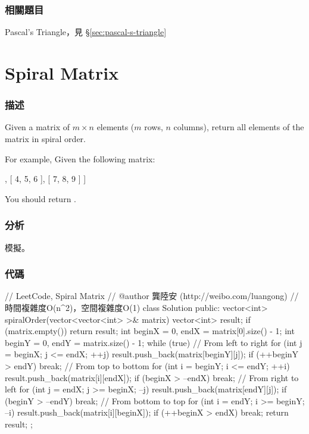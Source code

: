 \subsubsection{相關題目}
\begindot
\item Pascal's Triangle，見 \S \ref{sec:pascal-s-triangle}
\myenddot


\section{Spiral Matrix} %
\label{sec:spiral-matrix}


\subsubsection{描述}
Given a matrix of $m \times n$ elements ($m$ rows, $n$ columns), return all elements of the matrix in spiral order.

For example,
Given the following matrix:
\begin{Code}
[
 [ 1, 2, 3 ],
 [ 4, 5, 6 ],
 [ 7, 8, 9 ]
]
\end{Code}
You should return \fn{[1,2,3,6,9,8,7,4,5]}.


\subsubsection{分析}
模擬。

\subsubsection{代碼}
\begin{Code}
// LeetCode, Spiral Matrix
// @author 龔陸安 (http://weibo.com/luangong)
// 時間複雜度O(n^2)，空間複雜度O(1)
class Solution {
public:
    vector<int> spiralOrder(vector<vector<int> >& matrix) {
        vector<int> result;
        if (matrix.empty()) return result;
        int beginX = 0, endX = matrix[0].size() - 1;
        int beginY = 0, endY = matrix.size() - 1;
        while (true) {
            // From left to right
            for (int j = beginX; j <= endX; ++j) result.push_back(matrix[beginY][j]);
            if (++beginY > endY) break;
            // From top to bottom
            for (int i = beginY; i <= endY; ++i) result.push_back(matrix[i][endX]);
            if (beginX > --endX) break;
            // From right to left
            for (int j = endX; j >= beginX; --j) result.push_back(matrix[endY][j]);
            if (beginY > --endY) break;
            // From bottom to top
            for (int i = endY; i >= beginY; --i) result.push_back(matrix[i][beginX]);
            if (++beginX > endX) break;
        }
        return result;
    }
};
\end{Code}


